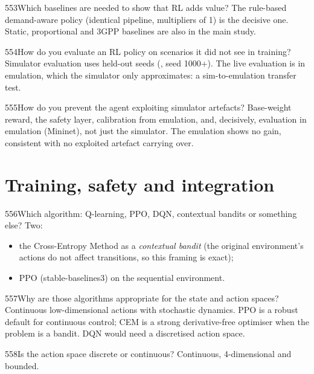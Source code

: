 \begin{qa}{553}{Which baselines are needed to show that RL adds value?}
The rule-based demand-aware policy (identical pipeline, multipliers of 1) is the decisive one. Static, proportional and
3GPP baselines are also in the main study.
\end{qa}

\begin{qa}{554}{How do you evaluate an RL policy on scenarios it did not see in training?}
Simulator evaluation uses held-out seeds (, seed 1000+). The live evaluation is in emulation,
which the simulator only approximates: a sim-to-emulation transfer test.
\end{qa}

\begin{qa}{555}{How do you prevent the agent exploiting simulator artefacts?}
Base-weight reward, the safety layer, calibration from emulation, and, decisively, evaluation in emulation (Mininet),
not just the simulator. The emulation shows no gain, consistent with no exploited artefact carrying over.
\end{qa}

\section{Training, safety and integration}

\begin{qa}{556}{Which algorithm: Q-learning, PPO, DQN, contextual bandits or something else?}
Two:
\begin{itemize}
\item the Cross-Entropy Method as a \emph{contextual bandit} (the original environment's actions do not affect
transitions, so this framing is exact);
\item PPO (stable-baselines3) on the sequential environment.
\end{itemize}
\end{qa}

\begin{qa}{557}{Why are those algorithms appropriate for the state and action spaces?}
Continuous low-dimensional actions with stochastic dynamics. PPO is a robust default for continuous control; CEM is a
strong derivative-free optimiser when the problem is a bandit. DQN would need a discretised action space.
\end{qa}

\begin{qa}{558}{Is the action space discrete or continuous?}
Continuous, 4-dimensional and bounded.
\end{qa}

